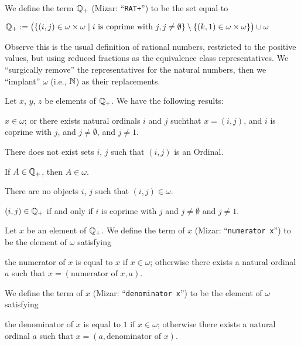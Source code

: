 \documentclass{article}
\begin{document}
\begin{definition}
We define the term $\mathbb{Q}_{+}$ (Mizar: ``\verb#RAT+#'') to be the set
equal to
\begin{defn}
\item $\mathbb{Q}_{+}:=\bigl(\{(i,j)\in\omega\times\omega\mid i\mbox{ is coprime with }j,j\neq\emptyset\}\setminus\{(k,1)\in\omega\times\omega\}\bigr)\cup\omega$
\end{defn}
\end{definition}

\begin{remark}
Observe this is the usual definition of rational numbers, restricted to
the positive values, but using reduced fractions as the equivalence
class representatives. We ``surgically remove'' the representatives for
the natural numbers, then we ``implant'' $\omega$ (i.e., $\mathbb{N}$) as their
replacements. 
\end{remark}

Let $x$, $y$, $z$ be elements of $\mathbb{Q}_{+}$. We have the following results:
\begin{thm}
\item\label{arytm3:29} $x\in\omega$; or there exists natural ordinals
  $i$ and $j$ suchthat $x=(i,j)$, and $i$ is coprime with $j$, and
  $j\neq\emptyset$, and $j\neq1$.
\item\label{arytm3:30} There does not exist sets $i$, $j$ such that
  $(i,j)$ is an Ordinal.
\item\label{arytm3:31} If $A\in\mathbb{Q}_{+}$, then $A\in\omega$.
\item\label{arytm3:32} There are no objects $i$, $j$ such that $(i,j)\in\omega$.
\item\label{arytm3:33} $(i,j)\in\mathbb{Q}_{+}$ if and only if $i$ is coprime
  with $j$ and $j\neq\emptyset$ and $j\neq1$.
\end{thm}

\begin{definition}
Let $x$ be an element of $\mathbb{Q}_{+}$.
We define the term  of $x$ (Mizar: ``\verb#numerator x#'')
to be the element of $\omega$ satisfying
\begin{defn}
\item the numerator of $x$ is equal to $x$ if $x\in\omega$; otherwise
  there exists a natural ordinal $a$ such that $x=(\mbox{numerator of }x,a)$.
\end{defn}
We define the term  of $x$ (Mizar:
``\verb#denominator x#'') to be the element of $\omega$ satisfying
\begin{defn}
\item the denominator of $x$ is equal to $1$ if $x\in\omega$; otherwise
  there exists a natural ordinal $a$ such that $x=(a,\mbox{denominator of }x)$.
\end{defn}
\end{definition}
\end{document}
